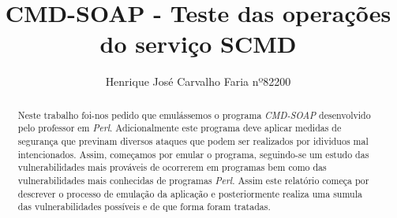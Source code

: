 %
\title{CMD-SOAP - Teste das operações do serviço SCMD}
%
%
\author{ Henrique José Carvalho Faria nº82200 }
%
%
%
\maketitle              %
%
\begin{abstract}


Neste trabalho foi-nos pedido que emulássemos o programa \textit{CMD-SOAP} desenvolvido pelo professor em \textit{Perl}. Adicionalmente este programa deve aplicar medidas de segurança que previnam diversos ataques que podem ser realizados por idividuos mal intencionados. Assim, começamos por emular o programa, seguindo-se um estudo das vulnerabilidades mais prováveis de ocorrerem em programas bem como das vulnerabilidades mais conhecidas de programas \textit{Perl}.
Assim este relatório começa por descrever o processo de emulação da aplicação e posteriormente realiza uma sumula das vulnerabilidades possíveis e de que forma foram tratadas.


\end{abstract}
%
%







